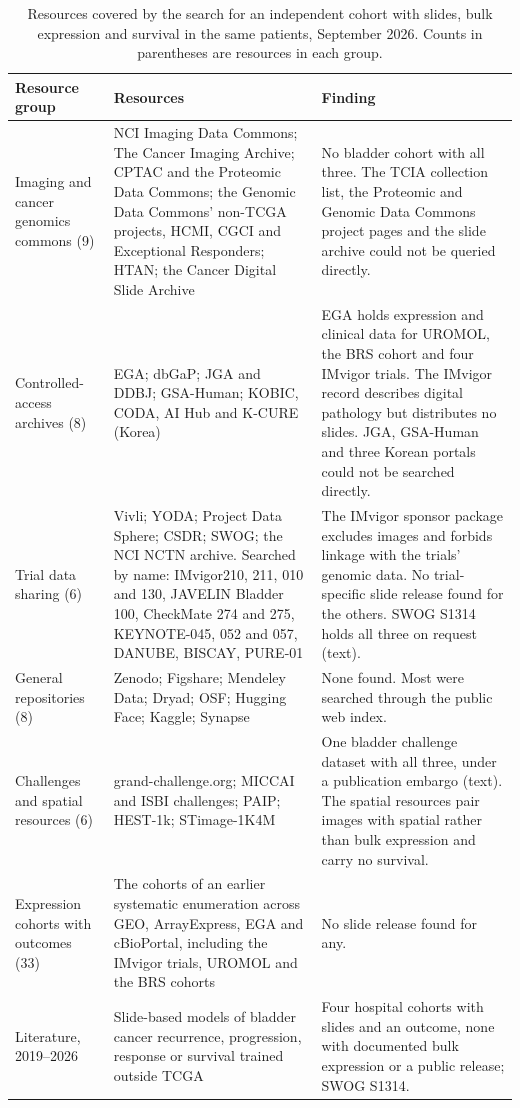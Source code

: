 \documentclass[11pt]{article}
\begin{document}
\begin{table}[h]
\centering\small
\begin{tabular}{@{}>{\raggedright\arraybackslash}p{3.1cm}>{\raggedright\arraybackslash}p{5.7cm}>{\raggedright\arraybackslash}p{6.4cm}@{}}
\toprule
Resource group & Resources & Finding \\
\midrule
Imaging and cancer genomics commons (9) & NCI Imaging Data Commons; The Cancer Imaging Archive; CPTAC and the Proteomic Data Commons; the Genomic Data Commons' non-TCGA projects, HCMI, CGCI and Exceptional Responders; HTAN; the Cancer Digital Slide Archive & No bladder cohort with all three. The TCIA collection list, the Proteomic and Genomic Data Commons project pages and the slide archive could not be queried directly. \\
Controlled-access archives (8) & EGA; dbGaP; JGA and DDBJ; GSA-Human; KOBIC, CODA, AI Hub and K-CURE (Korea) & EGA holds expression and clinical data for UROMOL, the BRS cohort and four IMvigor trials. The IMvigor record describes digital pathology but distributes no slides. JGA, GSA-Human and three Korean portals could not be searched directly. \\
Trial data sharing (6) & Vivli; YODA; Project Data Sphere; CSDR; SWOG; the NCI NCTN archive. Searched by name: IMvigor210, 211, 010 and 130, JAVELIN Bladder 100, CheckMate 274 and 275, KEYNOTE-045, 052 and 057, DANUBE, BISCAY, PURE-01 & The IMvigor sponsor package excludes images and forbids linkage with the trials' genomic data. No trial-specific slide release found for the others. SWOG S1314 holds all three on request (text). \\
General repositories (8) & Zenodo; Figshare; Mendeley Data; Dryad; OSF; Hugging Face; Kaggle; Synapse & None found. Most were searched through the public web index. \\
Challenges and spatial resources (6) & grand-challenge.org; MICCAI and ISBI challenges; PAIP; HEST-1k; STimage-1K4M & One bladder challenge dataset with all three, under a publication embargo (text). The spatial resources pair images with spatial rather than bulk expression and carry no survival. \\
Expression cohorts with outcomes (33) & The cohorts of an earlier systematic enumeration across GEO, ArrayExpress, EGA and cBioPortal, including the IMvigor trials, UROMOL and the BRS cohorts & No slide release found for any. \\
Literature, 2019--2026 & Slide-based models of bladder cancer recurrence, progression, response or survival trained outside TCGA & Four hospital cohorts with slides and an outcome, none with documented bulk expression or a public release; SWOG S1314. \\
\bottomrule
\end{tabular}
\caption{Resources covered by the search for an independent cohort with slides, bulk expression and
survival in the same patients, September 2026. Counts in parentheses are resources in each group.}
\label{tab:search}
\end{table}
\end{document}

